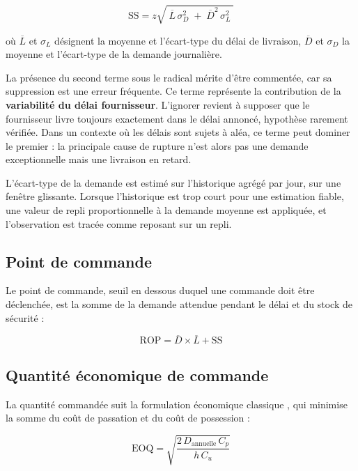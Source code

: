 \begin{equation}
\mathrm{SS} = z \sqrt{\; \overline{L}\,\sigma_D^2 \;+\; \overline{D}^2\,\sigma_L^2 \;}
\end{equation}

où $\overline{L}$ et $\sigma_L$ désignent la moyenne et l'écart-type du délai de livraison, $\overline{D}$ et $\sigma_D$ la moyenne et l'écart-type de la demande journalière.

La présence du second terme sous le radical mérite d'être commentée, car sa suppression est une erreur fréquente. Ce terme représente la contribution de la \textbf{variabilité du délai fournisseur}. L'ignorer revient à supposer que le fournisseur livre toujours exactement dans le délai annoncé, hypothèse rarement vérifiée. Dans un contexte où les délais sont sujets à aléa, ce terme peut dominer le premier : la principale cause de rupture n'est alors pas une demande exceptionnelle mais une livraison en retard.

L'écart-type de la demande est estimé sur l'historique agrégé par jour, sur une fenêtre glissante. Lorsque l'historique est trop court pour une estimation fiable, une valeur de repli proportionnelle à la demande moyenne est appliquée, et l'observation est tracée comme reposant sur un repli.

\subsection{Point de commande}

Le point de commande, seuil en dessous duquel une commande doit être déclenchée, est la somme de la demande attendue pendant le délai et du stock de sécurité :

\begin{equation}
\mathrm{ROP} = \overline{D} \times \overline{L} + \mathrm{SS}
\end{equation}

\subsection{Quantité économique de commande}

La quantité commandée suit la formulation économique classique \cite{harris1913eoq}, qui minimise la somme du coût de passation et du coût de possession :

\begin{equation}
\mathrm{EOQ} = \sqrt{\frac{2\, D_{\text{annuelle}}\, C_p}{h\, C_u}}
\end{equation}


